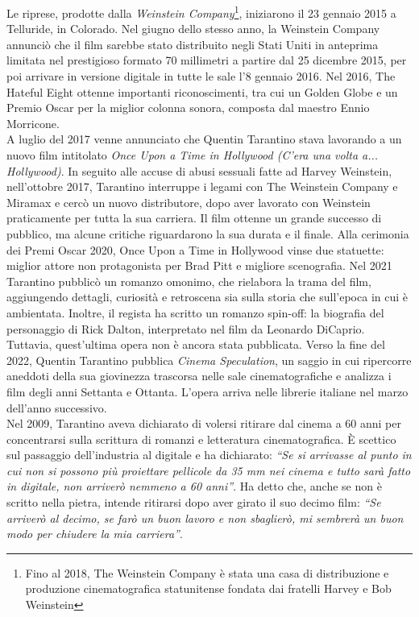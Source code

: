\documentclass[12pt]{article} %
\begin{document}
\begin{flushleft}
Le riprese, prodotte dalla \textit{Weinstein Company}\footnote{Fino al 2018, The Weinstein Company è stata una casa di distribuzione e produzione cinematografica statunitense fondata dai fratelli Harvey e Bob Weinstein}, iniziarono il 23 gennaio 2015 a Telluride, in Colorado. Nel giugno dello stesso anno, la Weinstein Company annunciò che il film sarebbe stato distribuito negli Stati Uniti in anteprima limitata nel prestigioso formato 70 millimetri a partire dal 25 dicembre 2015, per poi arrivare in versione digitale in tutte le sale l'8 gennaio 2016.
Nel 2016, The Hateful Eight ottenne importanti riconoscimenti, tra cui un Golden Globe e un Premio Oscar per la miglior colonna sonora, composta dal maestro Ennio Morricone.
\\\vspace{1cm}
A luglio del 2017 venne annunciato che Quentin Tarantino stava lavorando a un nuovo film intitolato \textit{Once Upon a Time in Hollywood (C'era una volta a... Hollywood)}.
In seguito alle accuse di abusi sessuali fatte ad Harvey Weinstein, nell'ottobre 2017, Tarantino interruppe i legami con The Weinstein Company e Miramax e cercò un nuovo distributore, dopo aver lavorato con Weinstein praticamente per tutta la sua carriera.
Il film ottenne un grande successo di pubblico, ma alcune critiche riguardarono la sua durata e il finale. Alla cerimonia dei Premi Oscar 2020, Once Upon a Time in Hollywood vinse due statuette: miglior attore non protagonista per Brad Pitt e migliore scenografia.
Nel 2021 Tarantino pubblicò un romanzo omonimo, che rielabora la trama del film, aggiungendo dettagli, curiosità e retroscena sia sulla storia che sull’epoca in cui è ambientata. Inoltre, il regista ha scritto un romanzo spin-off: la biografia del personaggio di Rick Dalton, interpretato nel film da Leonardo DiCaprio. Tuttavia, quest’ultima opera non è ancora stata pubblicata.
Verso la fine del 2022, Quentin Tarantino pubblica \textit{Cinema Speculation}, un saggio in cui ripercorre aneddoti della sua giovinezza trascorsa nelle sale cinematografiche e analizza i film degli anni Settanta e Ottanta. L'opera arriva nelle librerie italiane nel marzo dell'anno successivo.\\\vspace{1cm}
Nel 2009, Tarantino aveva dichiarato di volersi ritirare dal cinema a 60 anni per concentrarsi sulla scrittura di romanzi e letteratura cinematografica. È scettico sul passaggio dell'industria al digitale e ha dichiarato: \textit{“Se si arrivasse al punto in cui non si possono più proiettare pellicole da 35 mm nei cinema e tutto sarà fatto in digitale, non arriverò nemmeno a 60 anni”}. Ha detto che, anche se non è scritto nella pietra, intende ritirarsi dopo aver girato il suo decimo film: \textit{“Se arriverò al decimo, se farò un buon lavoro e non sbaglierò, mi sembrerà un buon modo per chiudere la mia carriera”}.
\end{flushleft}
\break
\end{document}

